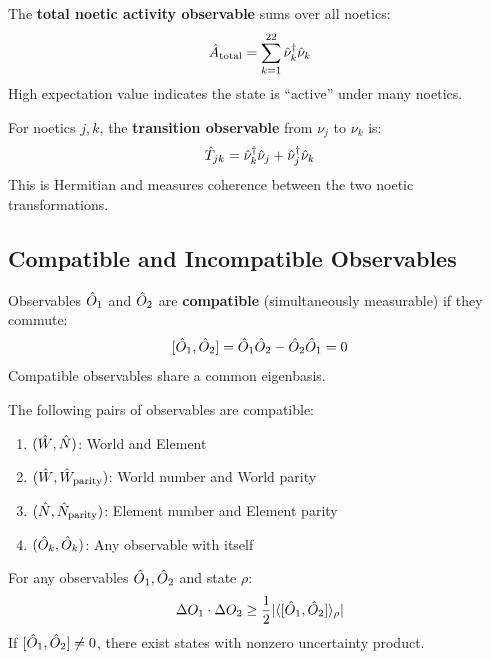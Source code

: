 \begin{definition}
\label{def:noetic-activity}
The \textbf{total noetic activity observable} sums over all noetics:
\[
\hat{A}_{\mathrm{total}} = \sum_{k=1}^{22} \hat{\nu}_k^\dagger \hat{\nu}_k
\]
High expectation value indicates the state is ``active'' under many noetics.
\end{definition}

\begin{definition}
\label{def:noetic-transition}
For noetics $j, k$, the \textbf{transition observable} from $\nu_j$ to $\nu_k$ is:
\[
\hat{T}_{jk} = \hat{\nu}_k^\dagger \hat{\nu}_j + \hat{\nu}_j^\dagger \hat{\nu}_k
\]
This is Hermitian and measures coherence between the two noetic transformations.
\end{definition}

\subsection{Compatible and Incompatible Observables}

\begin{definition}
\label{def:compatible}
Observables $\hat{O}_1$ and $\hat{O}_2$ are \textbf{compatible} (simultaneously measurable) if they commute:
\[
[\hat{O}_1, \hat{O}_2] = \hat{O}_1 \hat{O}_2 - \hat{O}_2 \hat{O}_1 = 0
\]
Compatible observables share a common eigenbasis.
\end{definition}

\begin{proposition}
\label{prop:tks-compatible}
The following pairs of observables are compatible:
\begin{enumerate}
  \item $(\hat{W}, \hat{N})$: World and Element
  \item $(\hat{W}, \hat{W}_{\mathrm{parity}})$: World number and World parity
  \item $(\hat{N}, \hat{N}_{\mathrm{parity}})$: Element number and Element parity
  \item $(\hat{O}_k, \hat{O}_k)$: Any observable with itself
\end{enumerate}
\end{proposition}

\begin{theorem}
\label{thm:robertson}
For any observables $\hat{O}_1, \hat{O}_2$ and state $\rho$:
\[
\Delta O_1 \cdot \Delta O_2 \geq \frac{1}{2} |\langle [\hat{O}_1, \hat{O}_2] \rangle_\rho|
\]
If $[\hat{O}_1, \hat{O}_2] \neq 0$, there exist states with nonzero uncertainty product.
\end{theorem}

